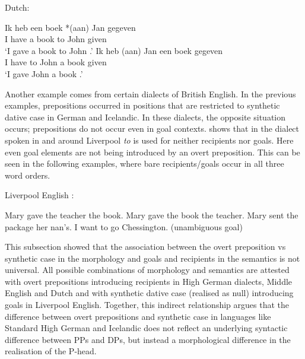 	\begin{exe}
		\ex Dutch:\label{ex:dutch-rec-marking}
		\begin{xlist}
			\ex \label{ex:dutch-rec-marking-tr}\gll Ik heb een boek *(aan) Jan gegeven\\
			I have a book to John given\\
			\trans `I gave a book to John \citep{Tiersma.1985}.'
			\ex \label{ex:dutch-rec-marking-rt}\gll Ik heb (aan) Jan een boek gegeven\\
			I have to John a book given\\
			\trans `I gave John a book \citep{Tiersma.1985}.'
		\end{xlist}
	\end{exe}
	Another example comes from certain dialects of British English. In the previous examples, prepositions occurred in positions that are restricted to synthetic dative case in German and Icelandic. In these dialects, the opposite situation occurs; prepositions do not occur even in goal contexts. \cite{Biggs.2015} shows that in the dialect spoken in and around Liverpool \textit{to} is used for neither recipients nor goals. Here even goal elements are not being introduced by an overt preposition. This can be seen in the following examples, where bare recipients/goals occur in all three word orders.
	\begin{exe}
		\ex Liverpool English \citep{Biggs.2015}:\label{ex:liverpool}
		\begin{xlist}
			\ex Mary gave the teacher the book.
			\ex Mary gave the book the teacher.
			\ex Mary sent the package her nan's.
			\ex I want to go Chessington. (unambiguous goal)
		\end{xlist}
	\end{exe}
	This subsection showed that the association between the overt preposition vs synthetic case in the morphology and goals and recipients in the semantics is not universal. All possible combinations of morphology and semantics are attested with overt prepositions introducing recipients in High German dialects, Middle English and Dutch and with synthetic dative case (realised as null) introducing goals in Liverpool English. Together, this indirect relationship argues that the difference between overt prepositions and synthetic case in languages like Standard High German and Icelandic does not reflect an underlying syntactic difference between PPs and DPs, but instead a morphological difference in the realisation of the P-head.
